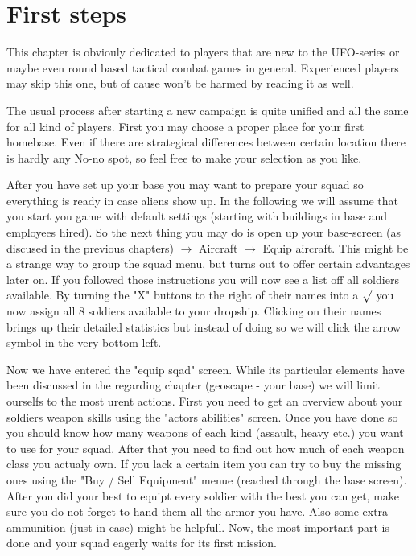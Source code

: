 \section{First steps}
This chapter is obviouly dedicated to players that are new to the UFO-series or maybe even round based tactical combat games in general. Experienced players may skip this one, but of cause won't be harmed by reading it as well.

The usual process after starting a new campaign is quite unified and all the same for all kind of players. First you may choose a proper place for your first homebase. Even if there are strategical differences between certain location there is hardly any No-no spot, so feel free to make your selection as you like.

After you have set up your base you may want to prepare your squad so everything is ready in case aliens show up. In the following we will assume that you start you game with default settings (starting with buildings in base and employees hired). So the next thing you may do is open up your base-screen (as discused in the previous chapters) $\rightarrow$ Aircraft $\rightarrow$ Equip aircraft. This might be a strange way to group the squad menu, but turns out to offer certain advantages later on. If you followed those instructions you will now see a list off all soldiers available. By turning the "X" buttons to the right of their names into a $\surd$ you now assign all 8 soldiers available to your dropship. Clicking on their names brings up their detailed statistics but instead of doing so we will click the arrow symbol in the very bottom left.

Now we have entered the "equip sqad" screen. While its particular elements have been discussed in the regarding chapter (geoscape - your base) we will limit ourselfs to the most urent actions. First you need to get an overview about your soldiers weapon skills using the "actors abilities" screen. Once you have done so you should know how many weapons of each kind (assault, heavy etc.) you want to use for your squad. After that you need to find out how much of each weapon class you actualy own. If you lack a certain item you can try to buy the missing ones using the "Buy / Sell Equipment" menue (reached through the base screen). After you did your best to equipt every soldier with the best you can get, make sure you do not forget to hand them all the armor you have. Also some extra ammunition (just in case) might be helpfull. Now, the most important part is done and your squad eagerly waits for its first mission.

